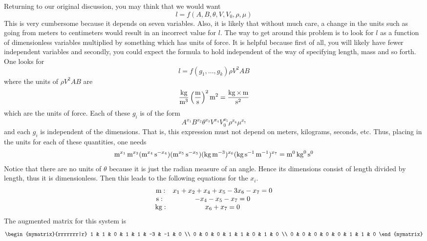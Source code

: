 Returning to our original discussion, you may think that we would want
\begin{equation*}
l=f(A,B,\theta ,V,V_{0},\rho ,\mu)
\end{equation*}
This is very cumbersome because it depends on seven variables. Also,
it is likely that without much care, a change in the units such as
going from meters to centimeters would result in an incorrect value
for $l$. The way to get around this problem is to look for $l $ as a
function of dimensionless variables multiplied by something which has
units of force. It is helpful because first of all, you will likely
have fewer independent variables and secondly, you could expect the
formula to hold independent of the way of specifying length, mass and
so forth. One looks for
\begin{equation*}
l=f(g_{1},\ldots,g_{k}) \rho V^{2}AB
\end{equation*}
where the units of $\rho V^{2}AB$ are
\begin{equation*}
\frac{\kg}{\m^{3}}\paren{\frac{\m}{\s }} ^{2}\m^{2}=\frac{\kg\times \m}{%
\s ^{2}}
\end{equation*}
which are the units of force. Each of these $g_{i}$ is of the form
\begin{equation}
A^{x_{1}}B^{x_{2}}\theta ^{x_{3}}V^{x_{4}}V_{0}^{x_{5}}\rho ^{x_{6}}\mu
^{x_{7}}  \label{11-july-e1f}
\end{equation}
and each $g_{i}$ is independent of the dimensions. That is, this expression
must not depend on meters, kilograms, seconds, etc. Thus, placing in the
units for each of these quantities, one needs
\begin{equation*}
\mathop{\textrm{\rm m}}\nolimits^{x_{1}}\mathop{\textrm{\rm m}}\nolimits^{x_{2}}(\mathop{\textrm{\rm m}}\nolimits^{x_{4}}\mathop{\textrm{\rm s}}\nolimits ^{-x_{4}}) (\mathop{\textrm{\rm m}}\nolimits^{x_{5}}\mathop{\textrm{\rm s}}\nolimits
^{-x_{5}}) (\mathop{\textrm{\rm kg}}\nolimits\mathop{\textrm{\rm m}}\nolimits^{-3}) ^{x_{6}}(\mathop{\textrm{\rm kg}}\nolimits\mathop{\textrm{\rm s}}\nolimits
^{-1}\mathop{\textrm{\rm m}}\nolimits^{-1}) ^{x_{7}}=\mathop{\textrm{\rm m}}\nolimits^{0}\mathop{\textrm{\rm kg}}\nolimits^{0}\mathop{\textrm{\rm s}}\nolimits ^{0}
\end{equation*}
Notice that there are no units of $\theta$ because it is just the radian
measure of an angle. Hence its dimensions consist of length divided by
length, thus it is dimensionless. Then this leads to the following equations
for the $x_{i}$.
\begin{equation*}
\begin{array}{cc}
\m: & x_{1}+x_{2}+x_{4}+x_{5}-3x_{6}-x_{7}=0 \\
\s :\  & -x_{4}-x_{5}-x_{7}=0 \\
\kg: & x_{6}+x_{7}=0%
\end{array}
\end{equation*}
The augmented matrix for this system is
\begin{equation*}
\begin{mymatrix}{rrrrrrr|r}
1 & 1 & 0 & 1 & 1 & -3 & -1 & 0 \\
0 & 0 & 0 & 1 & 1 & 0 & 1 & 0 \\
0 & 0 & 0 & 0 & 0 & 1 & 1 & 0
\end{mymatrix}
\end{equation*}
